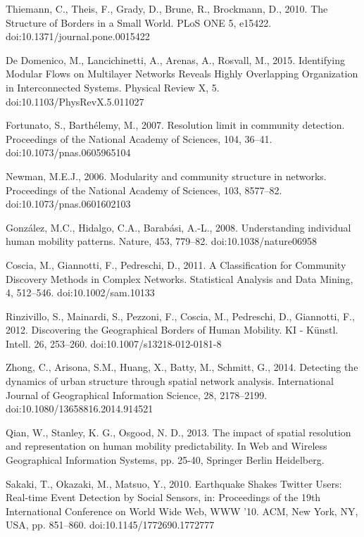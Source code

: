 \documentclass[10pt,letterpaper]{article}
\begin{document}
\begin{thebibliography}{10}
Thiemann, C., Theis, F., Grady, D., Brune, R., Brockmann, D., 2010. The Structure of Borders in a Small World. PLoS ONE 5, e15422. doi:10.1371/journal.pone.0015422

De Domenico, M., Lancichinetti, A., Arenas, A., Rosvall, M., 2015. Identifying Modular Flows on Multilayer Networks Reveals Highly Overlapping Organization in Interconnected Systems. Physical Review X, 5. doi:10.1103/PhysRevX.5.011027

Fortunato, S., Barthélemy, M., 2007. Resolution limit in community detection. Proceedings of the National Academy of Sciences, 104, 36–41. doi:10.1073/pnas.0605965104

Newman, M.E.J., 2006. Modularity and community structure in networks. Proceedings of the National Academy of Sciences, 103, 8577–82. doi:10.1073/pnas.0601602103

González, M.C., Hidalgo, C.A., Barabási, A.-L., 2008. Understanding individual human mobility patterns. Nature, 453, 779–82. doi:10.1038/nature06958

Coscia, M., Giannotti, F., Pedreschi, D., 2011. A Classification for Community Discovery Methods in Complex Networks. Statistical Analysis and Data Mining, 4, 512–546. doi:10.1002/sam.10133

Rinzivillo, S., Mainardi, S., Pezzoni, F., Coscia, M., Pedreschi, D., Giannotti, F., 2012. Discovering the Geographical Borders of Human Mobility. KI - Künstl. Intell. 26, 253–260. doi:10.1007/s13218-012-0181-8

Zhong, C., Arisona, S.M., Huang, X., Batty, M., Schmitt, G., 2014. Detecting the dynamics of urban structure through spatial network analysis. International Journal of Geographical Information Science, 28, 2178–2199. doi:10.1080/13658816.2014.914521

Qian, W., Stanley, K. G., Osgood, N. D., 2013. The impact of spatial resolution and representation on human mobility predictability. In Web and Wireless Geographical Information Systems,  pp. 25-40, Springer Berlin Heidelberg.

Sakaki, T., Okazaki, M., Matsuo, Y., 2010. Earthquake Shakes Twitter Users: Real-time Event Detection by Social Sensors, in: Proceedings of the 19th International Conference on World Wide Web, WWW ’10. ACM, New York, NY, USA, pp. 851–860. doi:10.1145/1772690.1772777


\end{thebibliography}
\end{document}
